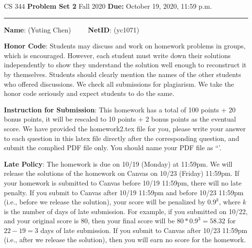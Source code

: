 \documentclass[12pt]{article}
\begin{document}
\noindent
CS 344 \hfill \textbf{Problem Set 2} \newline 
{Fall 2020} \hfill \textbf{Due:} October 19, 2020, 11:59 p.m.

\noindent
\rule{\linewidth}{0.4pt}

\vspace{.5cm}

\textbf{Name}: ({\color{blue}Yuting Chen})~~~~~\textbf{NetID}: ({\color{blue}yc1071})

\vspace{.5cm}

\textbf{Honor Code}: Students may discuss and work on homework problems in groups, which is encouraged. However, each student must write down their solutions independently to show they understand the solution well enough to reconstruct it by themselves.  Students should clearly mention the names of the other students who offered discussions. We check all submissions for plagiarism. We take the honor code seriously and expect students to do the same.


\vspace{.5cm}

\textbf{Instruction for Submission}: This homework has a total of 100 points + 20 bonus points, it will be rescaled to 10 points + 2 bonus points as the eventual score. We have provided the homework2.tex file for you, please write your answer to each question in this latex file directly after the corresponding question, and submit the complied PDF file only. You should name your PDF file as ``{\color{blue}{Firstname-Lastname-NetID.pdf'}}'.

\vspace{.5cm}

\textbf{Late Policy}: The homework is due on 10/19 (Monday) at 11:59pm. We will release the solutions of the homework on Canvas on 10/23 (Friday) 11:59pm. If your homework is submitted to Canvas before 10/19 11:59pm, there will no late penalty. If you submit to Canvas after 10/19 11:59pm and before 10/23 11:59pm (i.e., before we release the solution), your score will be penalized by $0.9^k$, where $k$ is the number of days of late submission. For example, if you submitted on 10/22, and your original score is 80, then your final score will be $80*0.9^3=58.32$ for $22-19=3$ days of late submission. If you submit to Canvas after 10/23 11:59pm (i.e., after we release the solution), then you will earn no score for the homework.

\vspace{.5cm}
\end{document}
